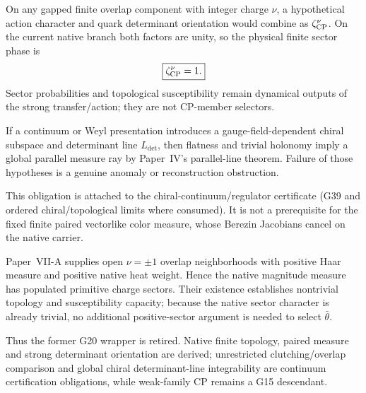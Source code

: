 \documentclass[12pt,a4paper]{article}
\begin{document}
\begin{proposition}
\label{p7:prop:v190-index-determinant-phase}
On any gapped finite overlap component with integer charge \(\nu\), a
hypothetical action character and quark determinant orientation would combine
as \(\zeta_{\rm CP}^{\nu}\).  On the current native branch both factors are
unity, so the physical finite sector phase is
\[
 \boxed{\zeta_{\rm CP}^{\nu}=1.}
\]
Sector probabilities and topological susceptibility remain dynamical outputs
of the strong transfer/action; they are not CP-member selectors.
\end{proposition}

\begin{proposition}
\label{p7:prop:global-chiral-measure-trivialization-test}
If a continuum or Weyl presentation introduces a gauge-field-dependent
chiral subspace and determinant line \(L_{\det}\), then flatness and trivial
holonomy imply a global parallel measure ray by Paper~IV's
parallel-line theorem.  Failure of those hypotheses is a genuine anomaly or
reconstruction obstruction.

This obligation is attached to the chiral-continuum/regulator certificate
(G39 and ordered chiral/topological limits where consumed).  It is not a
prerequisite for the fixed finite paired vectorlike color measure, whose
Berezin Jacobians cancel on the native carrier.
\end{proposition}

\begin{proposition}
\label{p7:prop:cp-fixed-positive-sector}
Paper~VII-A supplies open \(\nu=\pm1\) overlap neighborhoods with positive
Haar measure and positive native heat weight.  Hence the native magnitude
measure has populated primitive charge sectors.  Their existence establishes
nontrivial topology and susceptibility capacity; because the native sector
character is already trivial, no additional positive-sector argument is
needed to select \(\bar\theta\).
\end{proposition}

Thus the former G20 wrapper is retired.  Native finite topology, paired
measure and strong determinant orientation are derived; unrestricted
clutching/overlap comparison and global chiral determinant-line integrability
are continuum certification obligations, while weak-family CP remains a G15
descendant.
\end{document}

